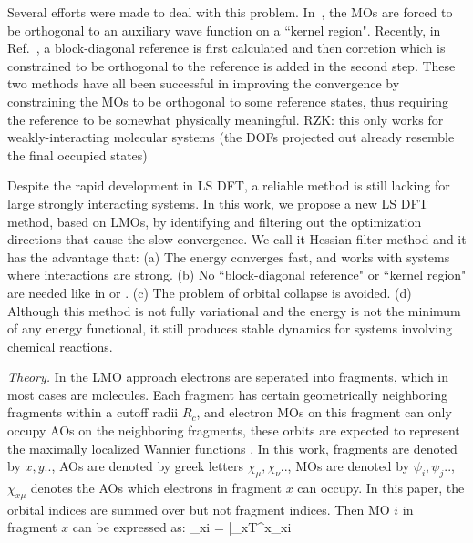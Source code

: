 \documentclass[aps,prl,twocolumn,reprint,amsmath,amssymb]{revtex4-1}
\begin{document}
Several efforts were made to deal with this problem. In~\cite{tsuchida2007augmented,tsuchida2008ab}, the MOs are forced to be orthogonal to an auxiliary wave function on a ``kernel region". Recently, in Ref.~, a block-diagonal reference is first calculated and then corretion which is constrained to be orthogonal to the reference is added in the second step. These two methods have all been successful in improving the convergence by constraining the MOs to be orthogonal to some reference states, thus requiring the reference to be somewhat physically meaningful. RZK: this only works for weakly-interacting molecular systems (the DOFs projected out already resemble the final occupied states)

Despite the rapid development in LS DFT, a reliable method is still lacking for large strongly interacting systems. In this work, we propose a new LS DFT method, based on LMOs, by identifying and filtering out the optimization directions that cause the slow convergence. We call it Hessian filter method and it has the advantage that: (a) The energy converges fast, and works with systems where interactions are strong. (b) No ``block-diagonal reference" or ``kernel region" are needed like in \cite{tsuchida2007augmented} or \cite{khaliullin2013efficient}.
(c) The problem of orbital collapse is avoided. (d) Although this method is not fully variational and the energy is not the minimum of any energy functional, it still produces stable dynamics for systems involving chemical reactions. 

\emph{Theory.} 
In the LMO approach electrons are seperated into fragments, which in most cases are molecules. Each fragment has certain geometrically neighboring fragments within a cutoff radii $R_c$, and electron MOs on this fragment can only occupy AOs on the neighboring fragments, these orbits are expected to represent the maximally localized Wannier functions \cite{marzari1997maximally,he2001exponential}. In this work, fragments are denoted by $x,y..$, AOs are denoted by greek letters $\chi_\mu,\chi_\nu ..$, MOs are denoted by $\psi_i,\psi_j..$, $\chi_{x\mu}$ denotes the AOs which electrons in fragment $x$ can occupy. In this paper, the orbital indices are summed over but not fragment indices. Then MO $i$ in fragment $x$ can be expressed as:
\bea
\psi_{xi} = |\chi_{x\mu}\rangle T^{x\mu}_{\quad xi}
\label{eq:LMO}
\eea
\end{document}
